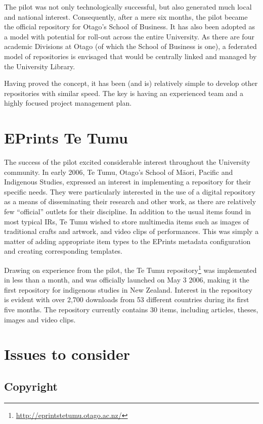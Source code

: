 \documentclass[12pt,pdftex,a4paper,titlepage]{article}
\begin{document}
The pilot was not only technologically successful, but also generated much local and national interest. Consequently, after a mere six months, the pilot became the official repository for Otago's School of Business. It has also been adopted as a model with potential for roll-out across the entire University. As there are four academic Divisions at Otago (of which the School of Business is one), a federated model of repositories is envisaged that would be centrally linked and managed by the University Library.

Having proved the concept, it has been (and is) relatively simple to develop other repositories with similar speed. The key is having an experienced team and a highly focused project management plan. 


\section{EPrints Te Tumu}

The success of the pilot excited considerable interest throughout the University community. In early 2006, Te Tumu, Otago's School of M\={a}ori, Pacific and Indigenous Studies, expressed an interest in implementing a repository for their specific needs. They were particularly interested in the use of a digital repository as a means of disseminating their research and other work, as there are relatively few ``official'' outlets for their discipline. In addition to the usual items found in most typical IRs, Te Tumu wished to store multimedia items such as images of traditional crafts and artwork, and video clips of performances. This was simply a matter of adding appropriate item types to the EPrints metadata configuration and creating corresponding templates.

Drawing on experience from the pilot, the Te Tumu repository\footnote{\url{http://eprintstetumu.otago.ac.nz/}} was implemented in less than a month, and was officially launched on May 3 2006, making it the first repository for indigenous studies in New Zealand. Interest in the repository is evident  with over 2,700 downloads from 53 different countries during its first five months. The repository currently contains 30 items, including articles, theses, images and video clips.


\section{Issues to consider}


\subsection{Copyright}
\end{document}
